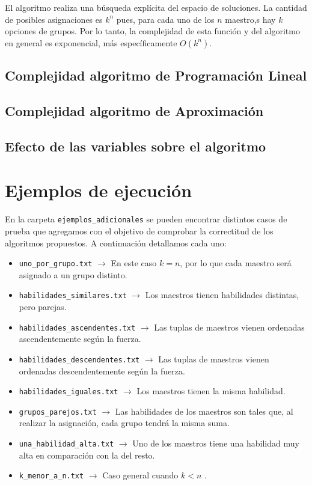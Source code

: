 \documentclass{article}
\begin{document}
El algoritmo realiza una búsqueda explícita del espacio de soluciones. La cantidad de posibles asignaciones es $k^n$ pues, para cada uno de los $n$ maestro,s hay $k$ opciones de grupos. Por lo tanto, la complejidad de esta función y del algoritmo en general es exponencial, más específicamente $O(k^n)$. 

\subsection{Complejidad algoritmo de Programación Lineal}
\subsection{Complejidad algoritmo de Aproximación}

\subsection{Efecto de las variables sobre el algoritmo}

\section{Ejemplos de ejecución}
\label{sec:ejemplos}

En la carpeta \texttt{ejemplos\_adicionales} se pueden encontrar distintos casos de prueba que agregamos con el objetivo de comprobar la correctitud de los algoritmos propuestos. A continuación detallamos cada uno:
\begin{itemize}
    \item \texttt{uno\_por\_grupo.txt} $\rightarrow$ En este caso $k = n$, por lo que cada maestro será asignado a un grupo distinto.
    \item \texttt{habilidades\_similares.txt} $\rightarrow$ Los maestros tienen habilidades distintas, pero parejas.
    \item \texttt{habilidades\_ascendentes.txt} $\rightarrow$ Las tuplas de maestros vienen ordenadas ascendentemente según la fuerza.
    \item \texttt{habilidades\_descendentes.txt} $\rightarrow$ Las tuplas de maestros vienen ordenadas descendentemente según la fuerza.
    \item \texttt{habilidades\_iguales.txt} $\rightarrow$ Los maestros tienen la misma habilidad.
    \item \texttt{grupos\_parejos.txt} $\rightarrow$ Las habilidades de los maestros son tales que, al realizar la asignación, cada grupo tendrá la misma suma.
    \item \texttt{una\_habilidad\_alta.txt} $\rightarrow$ Uno de los maestros tiene una habilidad muy alta en comparación con la del resto.
    \item \texttt{k\_menor\_a\_n.txt} $\rightarrow$ Caso general cuando $k < n$ .
\end{itemize}
\end{document}
